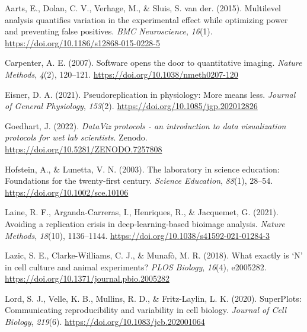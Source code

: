 \documentclass[
]{agujournal2019}
\newlength{\cslhangindent}
\newlength{\cslentryspacingunit} %
\newenvironment{CSLReferences}[2] %
 {%
  \setlength{\parindent}{0pt}
  \ifodd #1
  \let\oldpar\par
  \def\par{\hangindent=\cslhangindent\oldpar}
  \fi
  \setlength{\parskip}{#2\cslentryspacingunit}
 }%
 {}
\begin{document}
\hypertarget{refs}{}
\begin{CSLReferences}{1}{0}
\vspace{1em}

\leavevmode{}%
Aarts, E., Dolan, C. V., Verhage, M., \& Sluis, S. van der. (2015).
Multilevel analysis quantifies variation in the experimental effect
while optimizing power and preventing false positives. \emph{BMC
Neuroscience}, \emph{16}(1).
\url{https://doi.org/10.1186/s12868-015-0228-5}

\leavevmode{}%
Carpenter, A. E. (2007). Software opens the door to quantitative
imaging. \emph{Nature Methods}, \emph{4}(2), 120--121.
\url{https://doi.org/10.1038/nmeth0207-120}

\leavevmode{}%
Eisner, D. A. (2021). Pseudoreplication in physiology: More means less.
\emph{Journal of General Physiology}, \emph{153}(2).
\url{https://doi.org/10.1085/jgp.202012826}

\leavevmode{}%
Goedhart, J. (2022). \emph{DataViz protocols - an introduction to data
visualization protocols for wet lab scientists}. Zenodo.
\url{https://doi.org/10.5281/ZENODO.7257808}

\leavevmode{}%
Hofstein, A., \& Lunetta, V. N. (2003). The laboratory in science
education: Foundations for the twenty-first century. \emph{Science
Education}, \emph{88}(1), 28--54.
\url{https://doi.org/10.1002/sce.10106}

\leavevmode{}%
Laine, R. F., Arganda-Carreras, I., Henriques, R., \& Jacquemet, G.
(2021). Avoiding a replication crisis in deep-learning-based bioimage
analysis. \emph{Nature Methods}, \emph{18}(10), 1136--1144.
\url{https://doi.org/10.1038/s41592-021-01284-3}

\leavevmode{}%
Lazic, S. E., Clarke-Williams, C. J., \& Munafò, M. R. (2018). What
exactly is {`}N{'} in cell culture and animal experiments? \emph{PLOS
Biology}, \emph{16}(4), e2005282.
\url{https://doi.org/10.1371/journal.pbio.2005282}

\leavevmode{}%
Lord, S. J., Velle, K. B., Mullins, R. D., \& Fritz-Laylin, L. K.
(2020). SuperPlots: Communicating reproducibility and variability in
cell biology. \emph{Journal of Cell Biology}, \emph{219}(6).
\url{https://doi.org/10.1083/jcb.202001064}


\end{CSLReferences}
\end{document}

